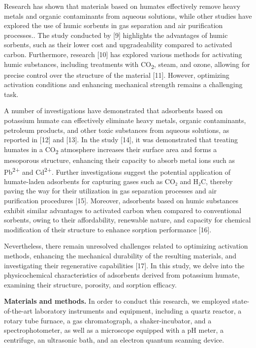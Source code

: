 \begin{multicols}{2}
Research has shown that materials based on humates effectively remove
heavy metals and organic contaminants from aqueous solutions, while
other studies have explored the use of humic sorbents in gas separation
and air purification processes.. The study conducted by {[}9{]}
highlights the advantages of humic sorbents, such as their lower cost
and upgradeability compared to activated carbon. Furthermore, research
{[}10{]} has explored various methods for activating humic substances,
including treatments with CO\textsubscript{2}, steam, and ozone,
allowing for precise control over the structure of the material
{[}11{]}. However, optimizing activation conditions and enhancing
mechanical strength remains a challenging task.

A number of investigations have demonstrated that adsorbents based on
potassium humate can effectively eliminate heavy metals, organic
contaminants, petroleum products, and other toxic substances from
aqueous solutions, as reported in {[}12{]} and {[}13{]}. In the study
{[}14{]}, it was demonstrated that treating humates in a
CO\textsubscript{2} atmosphere increases their surface area and forms a
mesoporous structure, enhancing their capacity to absorb metal ions such
as Pb\textsuperscript{2+} and Cd\textsuperscript{2+}. Further
investigations suggest the potential application of humate-laden
adsorbents for capturing gases such as CO₂ and H₂C, thereby paving the
way for their utilization in gas separation processes and air
purification procedures {[}15{]}. Moreover, adsorbents based on humic
substances exhibit similar advantages to activated carbon when compared
to conventional sorbents, owing to their affordability, renewable
nature, and capacity for chemical modification of their structure to
enhance sorption performance {[}16{]}.

Nevertheless, there remain unresolved challenges related to optimizing
activation methods, enhancing the mechanical durability of the resulting
materials, and investigating their regenerative capabilities {[}17{]}.
In this study, we delve into the physicochemical characteristics of
adsorbents derived from potassium humate, examining their structure,
porosity, and sorption efficacy.

{\bfseries Materials and methods.} In order to conduct this research, we
employed state-of-the-art laboratory instruments and equipment,
including a quartz reactor, a rotary tube furnace, a gas chromatograph,
a shaker-incubator, and a spectrophotometer, as well as a microscope
equipped with a pH meter, a centrifuge, an ultrasonic bath, and an
electron quantum scanning device.


\end{multicols}
